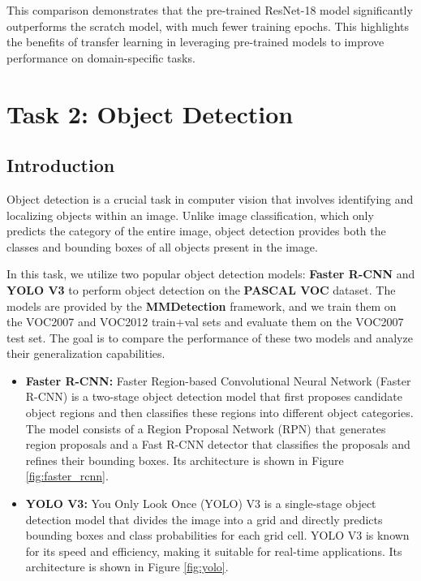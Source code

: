 \documentclass[UTF8]{ctexart}
\begin{document}
This comparison demonstrates that the pre-trained ResNet-18 model significantly outperforms the scratch model, with much
fewer training epochs. This highlights the benefits of transfer learning in leveraging pre-trained models to improve performance on domain-specific tasks.

    
\section{Task 2: Object Detection}
\subsection{Introduction}
Object detection is a crucial task in computer vision that involves identifying and localizing objects within an image.
Unlike image classification, which only predicts the category of the entire image, 
object detection provides both the classes and bounding boxes of all objects present in the image.

In this task, we utilize two popular object detection models: \textbf{Faster R-CNN} and \textbf{YOLO V3} to perform object detection on the \textbf{PASCAL VOC} dataset.
The models are provided by the \textbf{MMDetection} framework, and we train them on the VOC2007 and VOC2012 train+val sets and evaluate them on the VOC2007 test set.
The goal is to compare the performance of these two models and analyze their generalization capabilities.

\begin{itemize}
    \item \textbf{Faster R-CNN:} Faster Region-based Convolutional Neural Network (Faster R-CNN) is a two-stage object detection model that first proposes candidate object regions and then classifies these regions into different object categories. The model consists of a Region Proposal Network (RPN) that generates region proposals and a Fast R-CNN detector that classifies the proposals and refines their bounding boxes. Its architecture is shown in Figure \ref{fig:faster_rcnn}.
    \item \textbf{YOLO V3:} You Only Look Once (YOLO) V3 is a single-stage object detection model that divides the image into a grid and directly predicts bounding boxes and class probabilities for each grid cell. YOLO V3 is known for its speed and efficiency, making it suitable for real-time applications. Its architecture is shown in Figure \ref{fig:yolo}.
\end{itemize}
\end{document}
